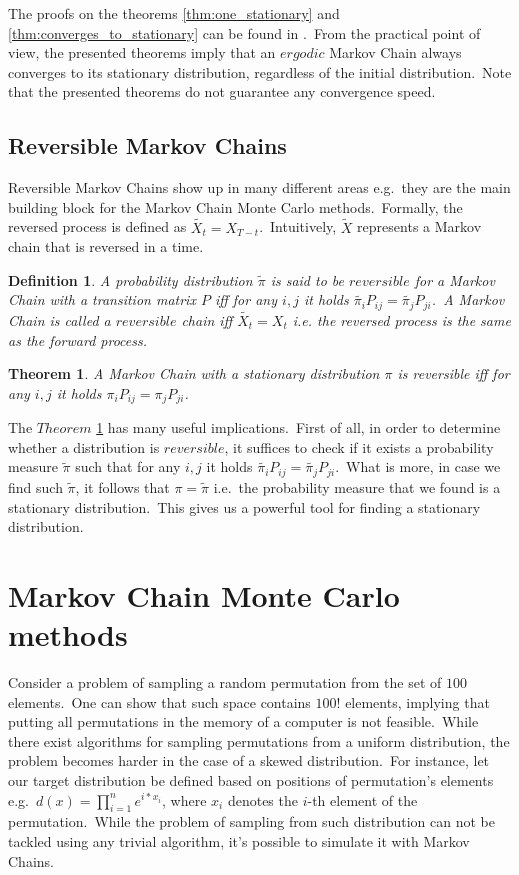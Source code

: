 \documentclass[a4paper, 11pt, onecolumn, openany, titlepage]{report}
\newcommand\numberedchapter[1]{\setlength\topskip{3cm}\chapter{#1}\setlength\topskip{0cm}}
\theoremstyle{default_theorem_style}\newtheorem{theorem}{Theorem}
\theoremstyle{default_theorem_style}\newtheorem{definition}{Definition}
\begin{document}
The proofs on the theorems \ref{thm:one_stationary} and \ref{thm:converges_to_stationary} can be found in
\cite{markov_chains_book}.\ From the practical point of view, the presented theorems imply that an $ergodic$ Markov
Chain always converges to its stationary distribution, regardless of the initial distribution.\ Note that the
presented theorems do not guarantee any convergence speed.

\section{Reversible Markov Chains}

Reversible Markov Chains show up in many different areas e.g.\ they are the main building block for the Markov
Chain Monte Carlo methods.\ Formally, the reversed process is defined as $\tilde{X_t} = X_{T - t}$.\ Intuitively,
$\tilde{X}$ represents a Markov chain that is reversed in a time.

\begin{definition}
A probability distribution $\tilde{\pi}$ is said to be $reversible$ for a Markov Chain with a transition matrix $P$
iff for any $i,j$ it holds $\tilde{\pi_i} P_{ij} = \tilde{\pi_j} P_{ji}$.\ A Markov Chain is called a $reversible$
chain iff $\tilde{X_t} = X_t$ i.e. the reversed process is the same as the forward process.
\end{definition}

\begin{theorem}\label{reversible_chain}
A Markov Chain with a stationary distribution $\pi$ is reversible iff for any $i, j$ it holds
$\pi_i P_{ij} = \pi_j P_{ji}$.
\end{theorem}

The $Theorem$ \ref{reversible_chain} has many useful implications.\ First of all, in order to determine whether a
distribution is $reversible$, it suffices to check if it exists a probability measure $\tilde{\pi}$ such that
for any $i, j$ it holds $\tilde{\pi_i} P_{ij} = \tilde{\pi_j} P_{ji}$.\ What is more, in case we find such
$\tilde{\pi}$, it follows that $\pi = \tilde{\pi}$ i.e.\ the probability measure that we found is a stationary
distribution.\ This gives us a powerful tool for finding a stationary distribution.

\numberedchapter{Markov Chain Monte Carlo methods}\label{chapter:mcmc}

Consider a problem of sampling a random permutation from the set of $100$ elements.\ One can show that such space
contains $100!$ elements, implying that putting all permutations in the memory of a computer is not feasible.\ While
there exist algorithms for sampling permutations from a uniform distribution, the problem becomes harder in the case of
a skewed distribution.\ For instance, let our target distribution be defined based on positions of permutation's
elements e.g.\ $d(x) = \prod_{i = 1}^{n} e^{i * x_i}$, where $x_i$ denotes the $i$-th element of the permutation.\ While
the problem of sampling from such distribution can not be tackled using any trivial algorithm, it's possible to
simulate it with Markov Chains.\newline
\end{document}
